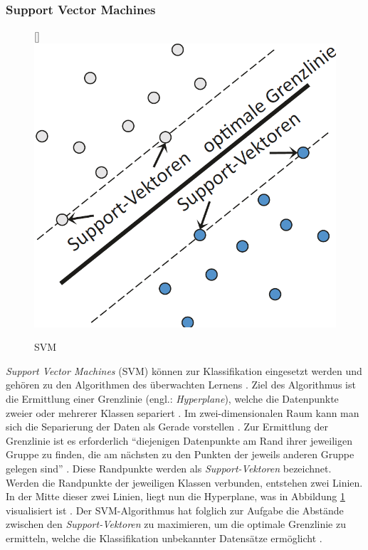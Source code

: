  \subsubsection{Support Vector Machines}
 \begin{figure}
    \centering
    \raisebox{0pt}[\dimexpr{}\baselineskip\relax]{\includegraphics[scale=0.3]{pic/MA-Bilder/support-vector-machines.PNG}}
    \caption{SVM \cite{Ng.2018}}
    \label{Fig:svm}
\end{figure} 
\emph{Support Vector Machines} (SVM) können zur Klassifikation eingesetzt werden und gehören zu den Algorithmen des überwachten Lernens \cite{Verdhan.2020}. Ziel des Algorithmus ist die Ermittlung einer Grenzlinie (engl.: \emph{Hyperplane}), welche die Datenpunkte zweier oder mehrerer Klassen separiert \cite{Ng.2018, noble2006support}. Im zwei-dimensionalen Raum kann man sich die Separierung der Daten als Gerade vorstellen \cite{Verdhan.2020}. Zur Ermittlung der Grenzlinie ist es erforderlich \enquote{diejenigen Datenpunkte am Rand ihrer jeweiligen Gruppe zu finden, die am nächsten zu den Punkten der jeweils anderen Gruppe gelegen sind} \cite{Ng.2018}. Diese Randpunkte werden als \emph{Support-Vektoren} bezeichnet. Werden die Randpunkte der jeweiligen Klassen verbunden, entstehen zwei Linien. In der Mitte dieser zwei Linien, liegt nun die Hyperplane, was in Abbildung \ref{Fig:svm} visualisiert ist \cite{Ng.2018}. Der SVM-Algorithmus hat folglich zur Aufgabe die Abstände zwischen den \emph{Support-Vektoren} zu maximieren, um die optimale Grenzlinie zu ermitteln, welche die Klassifikation unbekannter Datensätze ermöglicht \cite{Matzka.2021}.

